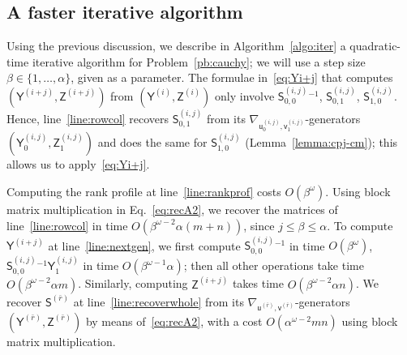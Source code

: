 \documentclass[sigconf]{acmart}
\newcommand{\vu}{\ensuremath{\mathsf{u}}}
\newcommand{\vv}{\ensuremath{\mathsf{v}}}
\newcommand{\mA}{\ensuremath{\mathsf{A}}}
\newcommand{\mS}{\ensuremath{\mathsf{S}}}
\newcommand{\mY}{\ensuremath{\mathsf{Y}}}
\newcommand{\mZ}{\ensuremath{\mathsf{Z}}}
\newcommand{\rank}{\ensuremath{\operatorname{rank}}}
\theoremstyle{acmdefinition}
\begin{document}

\subsection{A faster iterative algorithm}\label{ssec:quad}

Using the previous discussion, we describe in
Algorithm~\ref{algo:iter} a quadratic-time iterative algorithm for
Problem~\ref{pb:cauchy}; we will use a step size
$\beta \in \{1,\dots,\alpha\}$, given as a parameter.  The formulae
in~\eqref{eq:Yi+j} that computes $(\mY^{(i+j)},\mZ^{(i+j)})$ from
$(\mY^{(i)},\mZ^{(i)})$ only involve $\mS^{(i,j)}_{0,0}{}^{-1}$,
$\mS^{(i,j)}_{0,1}$, $\mS^{(i,j)}_{1,0}$.  Hence,
line~\ref{line:rowcol} recovers $\mS^{(i,j)}_{0,1}$ from its
$\nabla_{\vu^{(i,j)}_0, \vv^{(i,j)}_1}$-generators
$(\mY^{(i,j)}_0,\mZ^{(i,j)}_1)$ and does the same for
$\mS^{(i,j)}_{1,0}$ (Lemma~\ref{lemma:cpj-cm}); this allows us to
apply~\eqref{eq:Yi+j}.



Computing the rank profile at line~\ref{line:rankprof} costs
$O(\beta^\omega)$.  Using block matrix multiplication in
Eq.~\eqref{eq:recA2}, we recover the matrices of
line~\ref{line:rowcol} in time $O(\beta^{\omega-2} \alpha (m+n))$,
since $j \le \beta \le \alpha$.  To compute $\mY^{(i+j)}$ at
line~\ref{line:nextgen}, we first compute $\mS^{(i,j)}_{0,0}{}^{-1}$
in time $O(\beta^{\omega})$, $\mS^{(i,j)}_{0,0}{}^{-1} \mY^{(i,j)}_1$
in time $O(\beta^{\omega-1} \alpha)$; then all other operations take
time $O(\beta^{\omega-2} \alpha m)$.  Similarly, computing
$\mZ^{(i+j)}$ takes time $O(\beta^{\omega-2} \alpha n)$.  We recover
$\mS^{(\bar{r})}$ at line~\ref{line:recoverwhole} from its
$\nabla_{\vu^{(\bar{r})},\vv^{(\bar{r})}}$-generators
$(\mY^{(\bar{r})},\mZ^{(\bar{r})})$ by means of~\eqref{eq:recA2}, with
a cost $O(\alpha^{\omega-2} mn)$ using block matrix multiplication.
\end{document}
